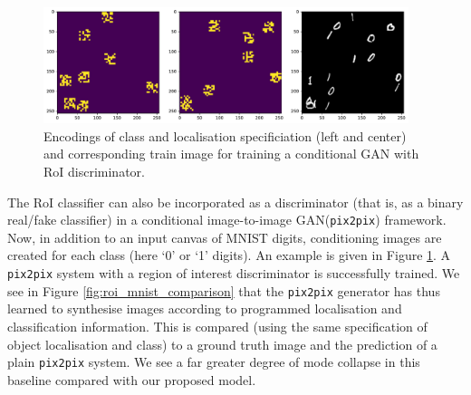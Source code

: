 \begin{figure}[h]
\centering
\includegraphics[width=0.95\textwidth]{img/roi_pix2pix_canvas.pdf}
\caption{Encodings of class and localisation specificiation (left and center) and corresponding train image for training a conditional GAN with RoI discriminator.}
\label{fig:roi_prediction}
\end{figure}

The RoI classifier can also be incorporated as a discriminator (that is, as a binary real/fake classifier) in a conditional image-to-image GAN(\texttt{pix2pix}) framework. Now, in addition to an input canvas of MNIST digits, conditioning images are created for each class (here `0' or `1' digits). An example is given in Figure \ref{fig:roi_prediction}. A \texttt{pix2pix} system with a region of interest discriminator is successfully trained. We see in Figure \ref{fig:roi_mnist_comparison} that the \texttt{pix2pix} generator has thus learned to synthesise images according to programmed localisation and classification information. This is compared (using the same specification of object localisation and class) to a ground truth image and the prediction of a plain \texttt{pix2pix} system. We see a far greater degree of mode collapse in this baseline compared with our proposed model.


